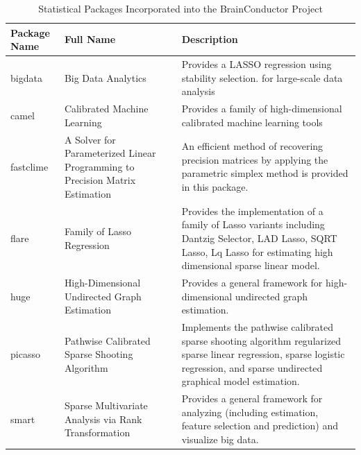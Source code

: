 \documentclass{nature}
\begin{document}
\begin{table}
\begin{footnotesize}
\begin{center}
    \begin{tabular}{ | l | p{4cm} |  p{6cm} |}
    \hline
	Package Name & Full Name & Description \\ \hline
	bigdata & Big Data Analytics & Provides a LASSO regression using stability
selection.
	for large-scale data analysis \\\hline
	camel & Calibrated Machine Learning & Provides a family of high-dimensional calibrated machine learning tools \\\hline
	fastclime & A Solver for Parameterized Linear Programming to Precision Matrix
Estimation &
	An efficient method of recovering precision matrices by applying the parametric
simplex method is provided in this package.  \\\hline
	flare & Family of Lasso Regression &
	Provides the implementation of a family of Lasso variants including Dantzig
Selector, LAD Lasso, SQRT Lasso, Lq Lasso for estimating high dimensional sparse
linear model. \\\hline
	huge & High-Dimensional Undirected Graph Estimation &
	Provides a general framework for high-dimensional undirected graph
estimation.\\\hline
	picasso &  Pathwise Calibrated Sparse Shooting Algorithm & Implements the
pathwise calibrated sparse shooting algorithm regularized sparse linear
regression, sparse logistic regression, and sparse undirected graphical model
estimation. \\\hline
	smart & Sparse Multivariate Analysis via Rank Transformation & Provides a
general framework for analyzing (including estimation, feature selection and
prediction) and visualize big data. \\\hline
    \end{tabular}
   \caption{Statistical Packages Incorporated into the BrainConductor Project}
   \label{tab:stat}
\end{center}
\end{footnotesize}
\end{table}
\end{document}
